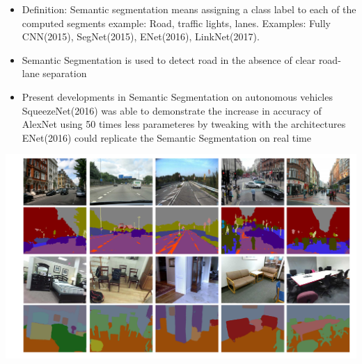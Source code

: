 \begin{itemize}
\item Definition: Semantic segmentation means assigning a class label to each of the computed segments example: Road, traffic lights, lanes. Examples: Fully CNN(2015), SegNet(2015), ENet(2016), LinkNet(2017). 
\item Semantic Segmentation is used to detect road in the absence of clear road-lane separation
\item Present developments in Semantic Segmentation on autonomous vehicles
   \subitem SqueezeNet(2016) was able to demonstrate the increase in accuracy of AlexNet using 50 times less parameteres by tweaking with the architectures
   \subitem ENet(2016) could replicate the Semantic Segmentation on real time
\end{itemize}
  \begin{minipage}{0.16\textwidth}
\centering
  \includegraphics[width=0.65\linewidth]{images/scr1.png}
\end{minipage}  
  
